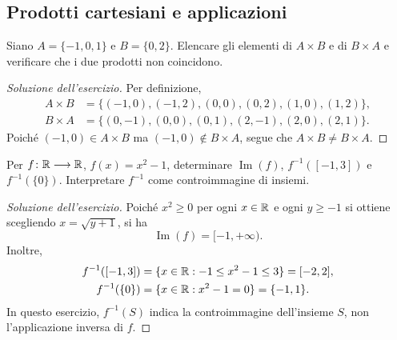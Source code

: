 \clearpage

\subsection{Prodotti cartesiani e applicazioni}
\label{sec:esercizi-fondamenti-prodotti-cartesiani}

\begin{exercise}
\label{ex:fondamenti-prodotto-cartesiano-finiti}
Siano $A=\{-1,0,1\}$ e $B=\{0,2\}$. Elencare gli elementi
di $A\times B$ e di $B\times A$ e verificare che i due prodotti
non coincidono.
\end{exercise}
\begin{proof}[Soluzione dell'esercizio]
Per definizione,
\[
\begin{aligned}
  A\times B
    &=\{(-1,0),(-1,2),(0,0),(0,2),(1,0),(1,2)\},\\
  B\times A
    &=\{(0,-1),(0,0),(0,1),(2,-1),(2,0),(2,1)\}.
\end{aligned}
\]
Poiché $(-1,0)\in A\times B$ ma $(-1,0)\notin B\times A$,
segue che $A\times B\ne B\times A$.
\end{proof}

\begin{exercise}
\label{ex:fondamenti-immagine-controimmagine-parabola}
Per $f\colon\mathbb{R}\longrightarrow\mathbb{R}$, $f(x)=x^2-1$,
determinare $\operatorname{Im}(f)$, $f^{-1}([-1,3])$
e $f^{-1}(\{0\})$. Interpretare $f^{-1}$ come controimmagine
di insiemi.
\end{exercise}
\begin{proof}[Soluzione dell'esercizio]
Poiché $x^2\ge0$ per ogni $x\in\mathbb{R}$ e ogni $y\ge-1$
si ottiene scegliendo $x=\sqrt{y+1}$, si ha
\[
  \operatorname{Im}(f)=[-1,+\infty).
\]
Inoltre,
\[
\begin{aligned}
  f^{-1}([-1,3])
    &=\{x\in\mathbb{R}:-1\le x^2-1\le3\}=[-2,2],\\
  f^{-1}(\{0\})
    &=\{x\in\mathbb{R}:x^2-1=0\}=\{-1,1\}.
\end{aligned}
\]
In questo esercizio, $f^{-1}(S)$ indica la controimmagine
dell'insieme $S$, non l'applicazione inversa di $f$.
\end{proof}

